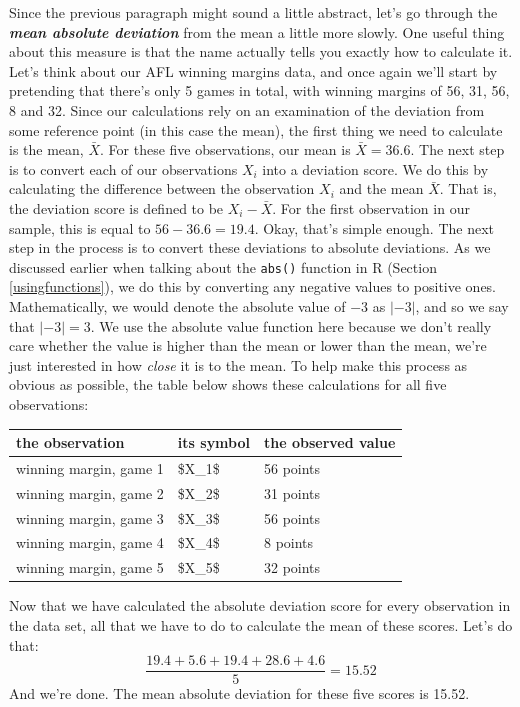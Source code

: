 \documentclass[
]{book}
\begin{document}
Since the previous paragraph might sound a little abstract, let's go through the \textbf{\emph{mean absolute deviation}} from the mean a little more slowly. One useful thing about this measure is that the name actually tells you exactly how to calculate it. Let's think about our AFL winning margins data, and once again we'll start by pretending that there's only 5 games in total, with winning margins of 56, 31, 56, 8 and 32. Since our calculations rely on an examination of the deviation from some reference point (in this case the mean), the first thing we need to calculate is the mean, \(\bar{X}\). For these five observations, our mean is \(\bar{X} = 36.6\). The next step is to convert each of our observations \(X_i\) into a deviation score. We do this by calculating the difference between the observation \(X_i\) and the mean \(\bar{X}\). That is, the deviation score is defined to be \(X_i - \bar{X}\). For the first observation in our sample, this is equal to \(56 - 36.6 = 19.4\). Okay, that's simple enough. The next step in the process is to convert these deviations to absolute deviations. As we discussed earlier when talking about the \texttt{abs()} function in R (Section \ref{usingfunctions}), we do this by converting any negative values to positive ones. Mathematically, we would denote the absolute value of \(-3\) as \(|-3|\), and so we say that \(|-3| = 3\). We use the absolute value function here because we don't really care whether the value is higher than the mean or lower than the mean, we're just interested in how \emph{close} it is to the mean. To help make this process as obvious as possible, the table below shows these calculations for all five observations:

\begin{tabular}{lll}
\toprule
the observation & its symbol & the observed value\\
\midrule
winning margin, game 1 & \$X\_1\$ & 56 points\\
winning margin, game 2 & \$X\_2\$ & 31 points\\
winning margin, game 3 & \$X\_3\$ & 56 points\\
winning margin, game 4 & \$X\_4\$ & 8 points\\
winning margin, game 5 & \$X\_5\$ & 32 points\\
\bottomrule
\end{tabular}

Now that we have calculated the absolute deviation score for every observation in the data set, all that we have to do to calculate the mean of these scores. Let's do that:
\[
\frac{19.4 + 5.6 + 19.4 + 28.6 + 4.6}{5} = 15.52
\]
And we're done. The mean absolute deviation for these five scores is 15.52.
\end{document}

